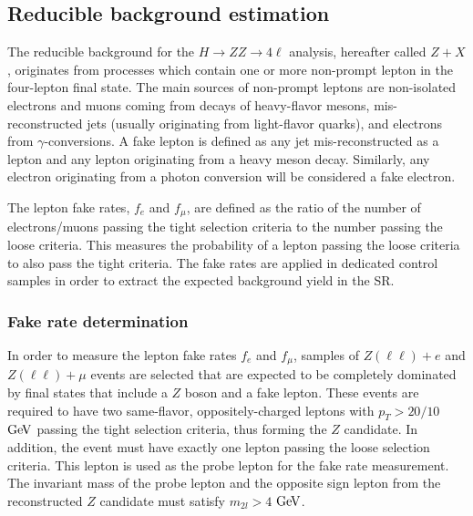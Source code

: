 \subsection{Reducible background estimation}
\label{sec:zxIntr}
%

The reducible background for the $H\to ZZ\to 4\ell $ analysis, hereafter called $Z+X$, originates from processes which contain one or more non-prompt lepton in the four-lepton final state. 
The main sources of non-prompt leptons are non-isolated electrons and muons coming from decays of heavy-flavor mesons, mis-reconstructed jets (usually originating from light-flavor quarks), and electrons from $\gamma$-conversions. 
A fake lepton is defined as any jet mis-reconstructed as a lepton and any lepton originating from a heavy meson decay.
Similarly, any electron originating from a photon conversion will be considered a fake electron.

The lepton fake rates, $f_{e}$ and $f_{\mu}$, are defined as the ratio of the number of electrons/muons passing the tight selection criteria to the number passing the loose criteria. This measures the probability of a lepton passing the loose criteria to also pass the tight criteria. 
The fake rates are applied in dedicated control samples in order to extract the expected background yield in the SR. 

\subsubsection{Fake rate determination}
In order to measure the lepton fake rates $f_{e}$ and $f_{\mu}$, samples of $Z(\ell\ell)+e$ and $Z(\ell\ell)+\mu$ events are selected that are expected to be completely dominated by final states that include a $Z$ boson and a fake lepton. 
These events are required to have two same-flavor, oppositely-charged leptons with $p_{T} > 20/10$ $\mathrm{Ge\kern -0.1em V}$ passing the tight selection criteria, thus forming the $Z$ candidate. In addition, the event must have exactly one lepton passing the loose selection criteria. 
This lepton is used as the probe lepton for the fake rate measurement. The invariant mass of the probe lepton and the opposite sign lepton from the reconstructed $Z$ candidate must satisfy $m_{2l} > 4$ $\mathrm{Ge\kern -0.1em V}$. 


